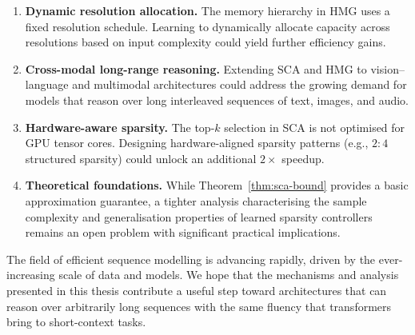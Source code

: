 \documentclass[12pt,a4paper,oneside]{book}
\begin{document}
\begin{enumerate}[label=\textbf{\arabic*.}, leftmargin=2em]
  \item \textbf{Dynamic resolution allocation.} The memory hierarchy in HMG uses a fixed
    resolution schedule. Learning to dynamically allocate capacity across resolutions
    based on input complexity could yield further efficiency gains.
  \item \textbf{Cross-modal long-range reasoning.} Extending SCA and HMG to
    vision--language and multimodal architectures could address the growing demand for
    models that reason over long interleaved sequences of text, images, and audio.
  \item \textbf{Hardware-aware sparsity.} The top-$k$ selection in SCA is not
    optimised for GPU tensor cores. Designing hardware-aligned sparsity patterns
    (e.g., $2{:}4$ structured sparsity) could unlock an additional $2\times$ speedup.
  \item \textbf{Theoretical foundations.} While Theorem~\ref{thm:sca-bound} provides a
    basic approximation guarantee, a tighter analysis characterising the sample
    complexity and generalisation properties of learned sparsity controllers remains an
    open problem with significant practical implications.
\end{enumerate}

The field of efficient sequence modelling is advancing rapidly, driven by the
ever-increasing scale of data and models. We hope that the mechanisms and analysis
presented in this thesis contribute a useful step toward architectures that can reason
over arbitrarily long sequences with the same fluency that transformers bring to
short-context tasks.

\backmatter
\end{document}
